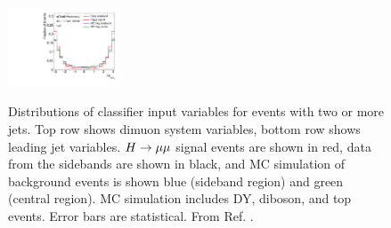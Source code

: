 \begin{figure}[h!]
  \includegraphics[width=0.3\textwidth]{figures/hmumu/vars/DeltaPhi_mumuj1} \\ 
  \caption[Classifier input variables]{
  Distributions of classifier
  input variables for events with two or more jets. Top row shows dimuon
  system variables, bottom row shows leading jet variables. $H \rightarrow \mu\mu$ signal events
  are shown in red, data from the sidebands are shown in black, and MC
  simulation of background events is shown blue (sideband region) and
  green (central region). MC simulation includes DY, diboson, and top events.
  Error bars are statistical. From Ref. \cite{ATLAS-CONF-2019-028}.
  }
  \label{fig:hmumu:variables01}
\end{figure}

